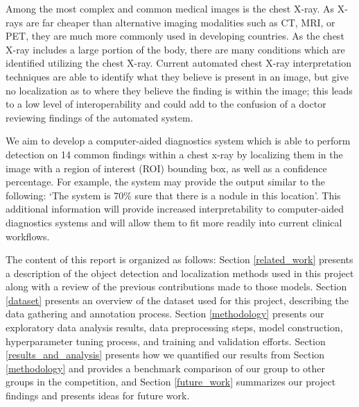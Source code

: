 \documentclass[conference]{IEEEtran}
\begin{document}
Among the most complex and common medical images is the chest X-ray. As X-rays are far cheaper than alternative imaging modalities such as CT, MRI, or PET, they are much more commonly used in developing countries. As the chest X-ray includes a large portion of the body, there are many conditions which are identified utilizing the chest X-ray. Current automated chest X-ray interpretation techniques are able to identify what they believe is present in an image, but give no localization as to where they believe the finding is within the image; this leads to a low level of interoperability and could add to the confusion of a doctor reviewing findings of the automated system. 

We aim to develop a computer-aided diagnostics system which is able to perform detection on 14 common findings within a chest x-ray by localizing them in the image with a region of interest (ROI) bounding box, as well as a confidence percentage. For example, the system may provide the output similar to the following:  ‘The system is 70\% sure that there is a nodule in this location’. This additional information will provide increased interpretability to computer-aided diagnostics systems and will allow them to fit more readily into current clinical workflows. 

The content of this report is organized as follows: Section \ref{related_work} presents a description of the object detection and localization methods used in this project along with a review of the previous contributions made to those models. Section \ref{dataset} presents an overview of the dataset used for this project, describing the data gathering and annotation process. Section \ref{methodology} presents our exploratory data analysis results, data preprocessing steps, model construction, hyperparameter tuning process, and training and validation efforts. Section \ref{results_and_analysis} presents how we quantified our results from Section \ref{methodology} and provides a benchmark comparison of our group to other groups in the competition, and Section \ref{future_work} summarizes our project findings and presents ideas for future work.
\end{document}
